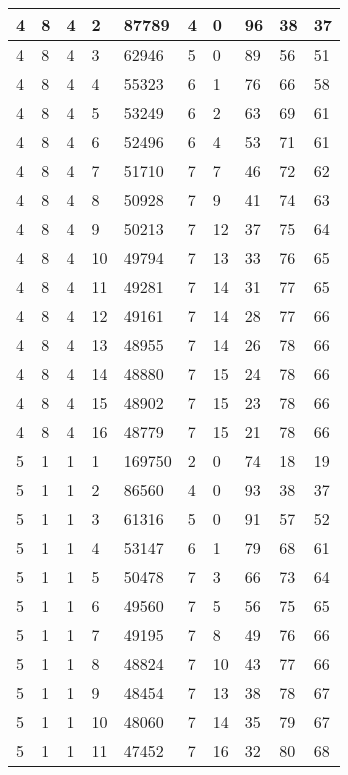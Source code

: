 \begin{table}[!ht]
\begin{tabular}{|l|l|l|l|l|l|l|l|l|l|}
        4 & 8 & 4 & 2 & 87789 & 4 & 0 & 96 & 38 & 37 \\ \hline
        4 & 8 & 4 & 3 & 62946 & 5 & 0 & 89 & 56 & 51 \\ \hline
        4 & 8 & 4 & 4 & 55323 & 6 & 1 & 76 & 66 & 58 \\ \hline
        4 & 8 & 4 & 5 & 53249 & 6 & 2 & 63 & 69 & 61 \\ \hline
        4 & 8 & 4 & 6 & 52496 & 6 & 4 & 53 & 71 & 61 \\ \hline
        4 & 8 & 4 & 7 & 51710 & 7 & 7 & 46 & 72 & 62 \\ \hline
        4 & 8 & 4 & 8 & 50928 & 7 & 9 & 41 & 74 & 63 \\ \hline
        4 & 8 & 4 & 9 & 50213 & 7 & 12 & 37 & 75 & 64 \\ \hline
        4 & 8 & 4 & 10 & 49794 & 7 & 13 & 33 & 76 & 65 \\ \hline
        4 & 8 & 4 & 11 & 49281 & 7 & 14 & 31 & 77 & 65 \\ \hline
        4 & 8 & 4 & 12 & 49161 & 7 & 14 & 28 & 77 & 66 \\ \hline
        4 & 8 & 4 & 13 & 48955 & 7 & 14 & 26 & 78 & 66 \\ \hline
        4 & 8 & 4 & 14 & 48880 & 7 & 15 & 24 & 78 & 66 \\ \hline
        4 & 8 & 4 & 15 & 48902 & 7 & 15 & 23 & 78 & 66 \\ \hline
        4 & 8 & 4 & 16 & 48779 & 7 & 15 & 21 & 78 & 66 \\ \hline
        5 & 1 & 1 & 1 & 169750 & 2 & 0 & 74 & 18 & 19 \\ \hline
        5 & 1 & 1 & 2 & 86560 & 4 & 0 & 93 & 38 & 37 \\ \hline
        5 & 1 & 1 & 3 & 61316 & 5 & 0 & 91 & 57 & 52 \\ \hline
        5 & 1 & 1 & 4 & 53147 & 6 & 1 & 79 & 68 & 61 \\ \hline
        5 & 1 & 1 & 5 & 50478 & 7 & 3 & 66 & 73 & 64 \\ \hline
        5 & 1 & 1 & 6 & 49560 & 7 & 5 & 56 & 75 & 65 \\ \hline
        5 & 1 & 1 & 7 & 49195 & 7 & 8 & 49 & 76 & 66 \\ \hline
        5 & 1 & 1 & 8 & 48824 & 7 & 10 & 43 & 77 & 66 \\ \hline
        5 & 1 & 1 & 9 & 48454 & 7 & 13 & 38 & 78 & 67 \\ \hline
        5 & 1 & 1 & 10 & 48060 & 7 & 14 & 35 & 79 & 67 \\ \hline
        5 & 1 & 1 & 11 & 47452 & 7 & 16 & 32 & 80 & 68 \\ \hline

\end{tabular}
\end{table}
